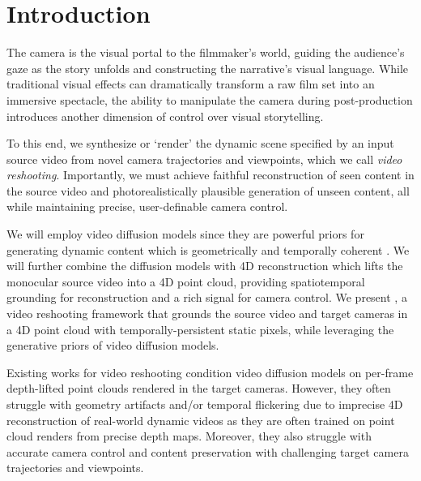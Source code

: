 \vspace*{-1em}\section{Introduction}
\label{sec:intro}

The camera is the visual portal to the filmmaker's world, guiding the audience's gaze as the story unfolds and constructing the narrative's visual language. While traditional visual effects can dramatically transform a raw film set into an immersive spectacle, the ability to manipulate the camera during post-production introduces another dimension of control over visual storytelling.

To this end, we synthesize or `render' the dynamic scene specified by an input source video from novel camera trajectories and viewpoints, which we call \emph{video reshooting}. Importantly, we must achieve faithful reconstruction of seen content in the source video and photorealistically plausible generation of unseen content, all while maintaining precise, user-definable camera control.

We will employ video diffusion models since they are powerful priors for generating dynamic content which is geometrically and temporally coherent \cite{brooks2024sora, wan2025, wiedemer2025videozeroshot, kong2025hunyuanvideosystematicframeworklarge, nvidia2025worldsimulationvideofoundation, genmo2024mochi}.  We will further combine the diffusion models with 4D reconstruction which lifts the monocular source video into a 4D point cloud, providing spatiotemporal grounding for reconstruction and a rich signal for camera control. We present \emph{\methodname}, a video reshooting framework that grounds the source video and target cameras in a 4D point cloud with temporally-persistent static pixels, while leveraging the generative priors of video diffusion models.

Existing works for video reshooting \cite{yu2025trajcraft, ren2025gen3c, hu2025ex4d} condition video diffusion models on per-frame depth-lifted point clouds rendered in the target cameras. However, they often struggle with geometry artifacts and/or temporal flickering due to imprecise 4D reconstruction of real-world dynamic videos as they are often trained on point cloud renders from precise depth maps. Moreover, they also struggle with accurate camera control and content preservation with challenging target camera trajectories and viewpoints.

